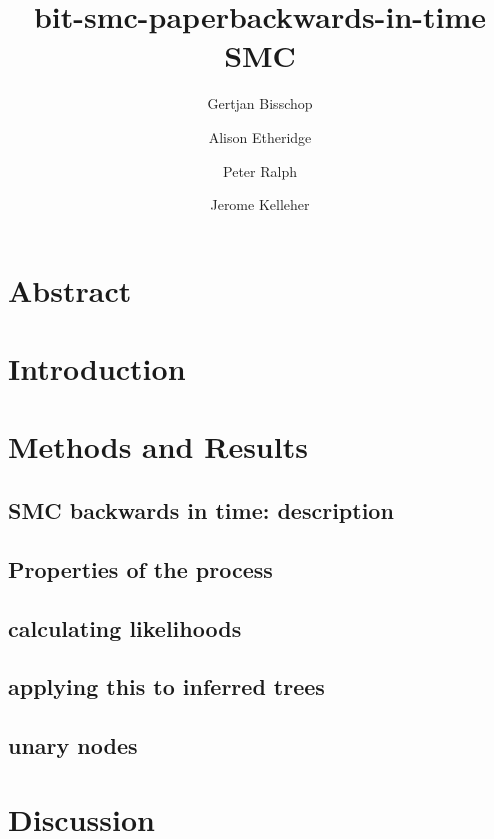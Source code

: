 \documentclass{article}
\title{bit-smc-paper}
\begin{document}
\linenumbers
\title{backwards-in-time SMC}

\author[1, $\dagger$]{Gertjan Bisschop}

\author[2]{Alison Etheridge}

\author[3]{Peter Ralph}
\author[1]{Jerome Kelleher}

\maketitle


\section{Abstract}


\section{Introduction}


\section{Methods and Results}
\subsection{SMC backwards in time: description}
\subsection{Properties of the process} 

\subsection{calculating likelihoods}


\subsection{applying this to inferred trees}

\subsection{unary nodes}


\section{Discussion}
\end{document}
